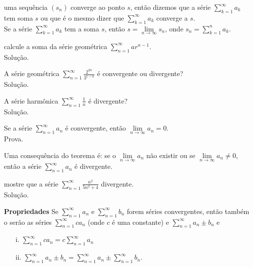 \begin{df}
	uma sequência $\left( s_{n}\right)$ converge ao ponto $s$, então dizemos que a série $\sum_{k=1}^{\infty} a_{k}$ tem soma $s$ ou que é o mesmo dizer que $\sum_{k=1}^{\infty} a_{k}$ converge a $s$.\\
	Se a série $\sum_{k=1}^{\infty} a_{k}$ tem a soma $s$, então $s=\lim\limits_{n\longrightarrow \infty} s_{n}$, onde $s_{n}=\sum_{k=1}^{n} a_{k}$.
\end{df}
\begin{ex}
	calcule a soma da série geométrica $\sum_{n=1}^{\infty}ar^{n-1}$.\\
	Solução.
\end{ex}
\vspace*{15cm}

\begin{ex}
	A série geométrica $\sum_{n=1}^{\infty}\frac{2^{2n}}{3^{1-n}}$ é convergente ou divergente?\\
	Solução.
\end{ex}
\vspace*{5cm}

\begin{ex}
	A série harmônica $\sum_{n=1}^{\infty}\frac{1}{n}$ é divergente?\\
	Solução.
\end{ex}
\vspace*{5cm}

\begin{teo}
	Se a série $\sum_{n=1}^{\infty} a_{n}$ é convergente, então $\lim\limits_{n\longrightarrow \infty} a_{n}=0$.\\
	Prova.
\end{teo}
\vspace*{5cm}

Uma consequência do teorema é: se o $\lim\limits_{n\longrightarrow \infty} a_{n}$ não existir ou se $\lim\limits_{n\longrightarrow \infty} a_{n}\neq 0$, então a série  $\sum_{n=1}^{\infty} a_{n}$ é divergente.
\begin{ex}
	mostre que a série $\sum_{n=1}^{\infty}\frac{n^{2}}{5n^{2}+4}$ divergente.\\
	Solução.
\end{ex}
\vspace*{5cm}

\textbf{Propriedades} 
Se $\sum_{n=1}^{\infty} a_{n}$ e $\sum_{n=1}^{\infty} b_{n}$ forem séries convergentes, então também o serão as séries $\sum_{n=1}^{\infty} ca_{n}$ (onde $c$ é uma constante) e $\sum_{n=1}^{\infty} a_{n}\pm b_{n}$ e
\begin{itemize}
\item[i.] $\sum_{n=1}^{\infty} ca_{n}=c\sum_{n=1}^{\infty} a_{n}$

\item[ii.] $\sum_{n=1}^{\infty} a_{n}\pm b_{n}=\sum_{n=1}^{\infty} a_{n}\pm \sum_{n=1}^{\infty} b_{n}$.
\end{itemize}

